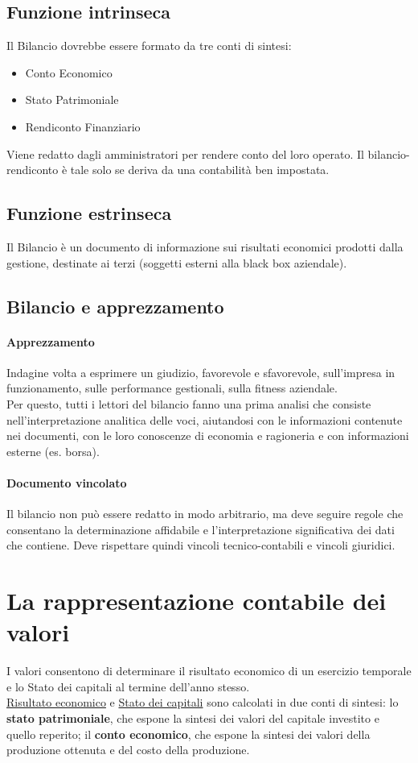 \documentclass{report}
\begin{document}
	\subsection{Funzione intrinseca}
	Il Bilancio dovrebbe essere formato da tre conti di sintesi:
	\begin{itemize}
		\item Conto Economico
		\item Stato Patrimoniale
		\item Rendiconto Finanziario
	\end{itemize}
	Viene redatto dagli amministratori per rendere conto del loro operato. Il bilancio-rendiconto è tale solo se deriva da una contabilità ben impostata.
	\subsection{Funzione estrinseca}
	Il Bilancio è un documento di informazione sui risultati economici prodotti dalla gestione, destinate ai terzi (soggetti esterni alla black box aziendale).
	\subsection{Bilancio e apprezzamento}
	\paragraph{Apprezzamento} Indagine volta a esprimere un giudizio, favorevole e sfavorevole, sull'impresa in funzionamento, sulle performance gestionali, sulla fitness aziendale.
	\medskip \\Per questo, tutti i lettori del bilancio fanno una prima analisi che consiste nell'interpretazione analitica delle voci, aiutandosi con le informazioni contenute nei documenti, con le loro conoscenze di economia e ragioneria e con informazioni esterne (es. borsa).
	\paragraph{Documento vincolato} Il bilancio non può essere redatto in modo arbitrario, ma deve seguire regole che consentano la determinazione affidabile e l'interpretazione significativa dei dati che contiene. Deve rispettare quindi vincoli tecnico-contabili e vincoli giuridici.
	\section{La rappresentazione contabile dei valori}
	I valori consentono di determinare il risultato economico di un esercizio temporale e lo Stato dei capitali al termine dell'anno stesso.\medskip \\\underline{Risultato economico} e \underline{Stato dei capitali} sono calcolati in due conti di sintesi: lo \textbf{stato patrimoniale}, che espone la sintesi dei valori del capitale investito e quello reperito; il \textbf{conto economico}, che espone la sintesi dei valori della produzione ottenuta e del costo della produzione.
\end{document}
